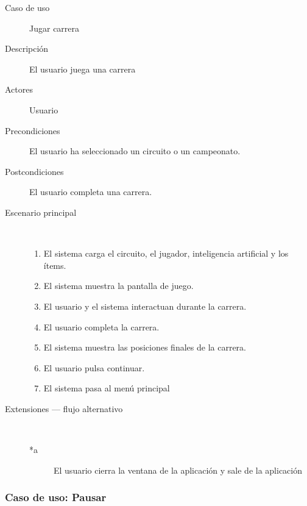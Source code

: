 \begin{description}
    \item[Caso de uso] Jugar carrera
    \item[Descripción] El usuario juega una carrera
    \item[Actores] Usuario
    \item[Precondiciones] El usuario ha seleccionado un circuito o un campeonato.
    \item[Postcondiciones] El usuario completa una carrera.
    \item[Escenario principal] $\quad$
        \begin{enumerate}
            \item El sistema carga el circuito, el jugador, inteligencia artificial y los ítems.
            \item El sistema muestra la pantalla de juego.
            \item El usuario y el sistema interactuan durante la carrera.
            \item El usuario completa la carrera.
            \item El sistema muestra las posiciones finales de la carrera.
            \item El usuario pulsa continuar.
            \item El sistema pasa al menú principal
        \end{enumerate}
    \item[Extensiones --- flujo alternativo] $\quad$
        \begin{description}
            \item[*a ] El usuario cierra la ventana de la aplicación y sale de la aplicación
        \end{description}
\end{description}

\subsubsection{Caso de uso: Pausar}

